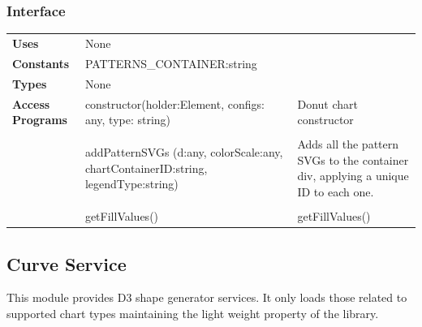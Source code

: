 \documentclass[12pt, titlepage]{article}
\begin{document}
\subsubsection{Interface}
\begin{table}[H]
\begin{tabular}{l p{5cm}p{5cm}}
\textbf{Uses}            & None                     &                                                                                                                  \\
\textbf{Constants}       & PATTERNS\_CONTAINER:string                             &                                                                                                     \\
                         
\textbf{Types}           & None                                       &                                                                                                                  \\
\textbf{Access Programs} & constructor(holder:Element, configs: any, type: string) & Donut chart constructor                                                                                            \\\\
                         & addPatternSVGs (d:any, colorScale:any, chartContainerID:string, legendType:string)                                     & Adds all the pattern SVGs to the container div, applying a unique ID to each one.  \\\\
                         & getFillValues()                       & getFillValues() \\
\end{tabular}
\end{table}

\subsection{Curve Service}
This module provides D3 shape generator services. It only loads those related to supported chart types maintaining the light weight property of the library.  
\end{document}
